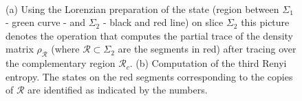 \documentclass[12pt]{article}
\numberwithin{equation}{section}
\begin{document}
\begin{figure}[h!]
\begin{center}
 ~~~ ~ 
 \caption{\label{fig:appendixRho1} (a) Using the Lorenzian preparation of the state (region between $\Sigma_1$ - green curve - and $\Sigma_2$ - black and red line) on slice $\Sigma_2$ this picture denotes the operation that computes the partial trace of the density matrix $\rho_{\mathcal{R}}$ (where $\mathcal{R}\subset \Sigma_2$ are the segments in red) after tracing over the complementary region $\mathcal{R}_c$. (b) Computation of the third Renyi entropy. The states on the red segments corresponding to the copies of $\mathcal{R}$ are identified as indicated by the numbers.}
\end{center}
\end{figure}
\end{document}
